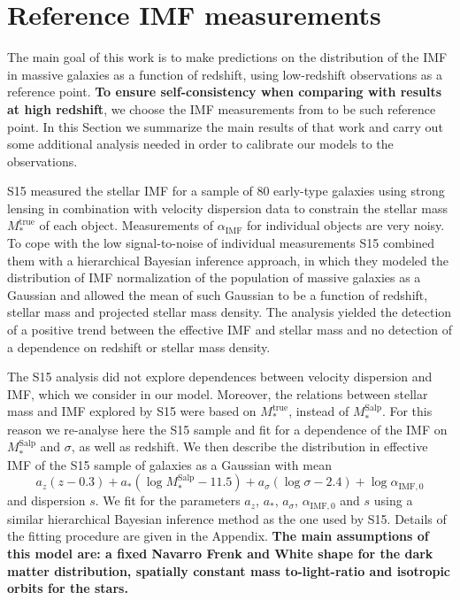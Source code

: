 \documentclass[usenatbib, letters]{mnras}
\def\mtrue{M_*^{\mathrm{true}}}
\def\msalp{M_*^{\mathrm{Salp}}}
\def\aimf{\alpha_{\mathrm{IMF}}}
\begin{document}
\section{Reference IMF measurements}\label{sect:obs}

The main goal of this work is to make predictions on the distribution of the IMF in massive galaxies as a function of redshift, using low-redshift observations as a reference point.
{\bf To ensure self-consistency when comparing with results at high redshift}, we choose the IMF measurements from \citet[][hereafter S15]{Son++15} to be such reference point.
In this Section we summarize the main results of that work and carry out some additional analysis needed in order to calibrate our models to the observations.

S15 measured the stellar IMF for a sample of 80 early-type galaxies using strong lensing in combination with velocity dispersion data to constrain the stellar mass $\mtrue$ of each object.
Measurements of $\aimf$ for individual objects are very noisy. To cope with the low signal-to-noise of individual measurements S15 combined them with a hierarchical Bayesian inference approach, in which they modeled the distribution of IMF normalization of the population of massive galaxies as a Gaussian and allowed the mean of such Gaussian to be a function of redshift, stellar mass and projected stellar mass density.
The analysis yielded the detection of a positive trend between the effective IMF and stellar mass and no detection of a dependence on redshift or stellar mass density.

The S15 analysis did not explore dependences between velocity dispersion and IMF, which we consider in our model.
Moreover, the relations between stellar mass and IMF explored by S15 were based on $\mtrue$, instead of $\msalp$.
For this reason we re-analyse here the S15 sample and fit for a dependence of the IMF on $\msalp$ and $\sigma$, as well as redshift. We then describe the distribution in effective IMF of the S15 sample of galaxies as a Gaussian with mean
\begin{equation}\label{eq:sl2sfit}
a_z(z - 0.3) + a_*(\log{\msalp} - 11.5) + a_\sigma(\log{\sigma} - 2.4) + \log{\alpha_{\mathrm{IMF},0}}
\end{equation}
and dispersion $s$. We fit for the parameters $a_z$, $a_*$, $a_\sigma$, $\alpha_{\mathrm{IMF},0}$ and $s$ using a similar hierarchical Bayesian inference method as the one used by S15.
Details of the fitting procedure are given in the Appendix.
{\bf The main assumptions of this model are: a fixed Navarro Frenk and White \citep{NFW} shape for the dark matter distribution, spatially constant mass to-light-ratio and isotropic orbits for the stars.}
\end{document}

